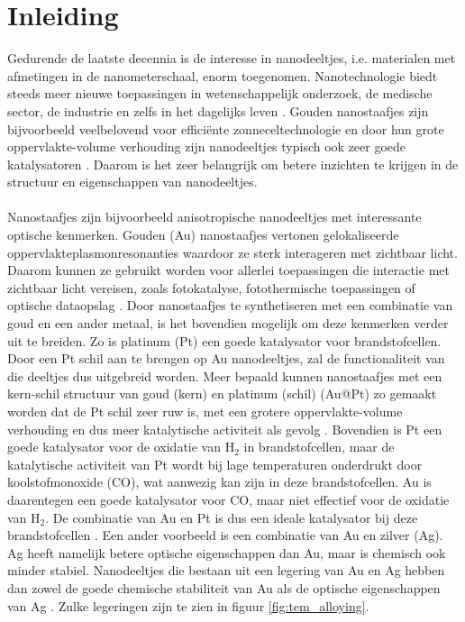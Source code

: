\documentclass{report}
\begin{document}
\chapter{Inleiding}
Gedurende de laatste decennia is de interesse in nanodeeltjes, i.e. materialen met afmetingen in de nanometerschaal, enorm toegenomen. Nanotechnologie biedt steeds meer nieuwe toepassingen in wetenschappelijk onderzoek, de medische sector, de industrie en zelfs in het dagelijks leven \cite{review:nanopart}. Gouden nanostaafjes zijn bijvoorbeeld veelbelovend voor efficiënte zonneceltechnologie en door hun grote oppervlakte-volume verhouding zijn nanodeeltjes typisch ook zeer goede katalysatoren \cite{review:nanopart}. Daarom is het zeer belangrijk om betere inzichten te krijgen in de structuur en eigenschappen van nanodeeltjes.
\\ \\
Nanostaafjes zijn bijvoorbeeld anisotropische nanodeeltjes met interessante optische kenmerken. Gouden (Au) nanostaafjes vertonen gelokaliseerde oppervlakteplasmonresonanties waardoor ze sterk interageren met zichtbaar licht. Daarom kunnen ze gebruikt worden voor allerlei toepassingen die interactie met zichtbaar licht vereisen, zoals fotokatalyse, fotothermische toepassingen of optische dataopslag \cite{paper:bimetalnr}. Door nanostaafjes te synthetiseren met een combinatie van goud en een ander metaal, is het bovendien mogelijk om deze kenmerken verder uit te breiden. Zo is platinum (Pt) een goede katalysator voor brandstofcellen. Door een Pt schil aan te brengen op Au nanodeeltjes, zal de functionaliteit van die deeltjes dus uitgebreid worden. Meer bepaald kunnen nanostaafjes met een kern-schil structuur van goud (kern) en platinum (schil) (Au@Pt) zo gemaakt worden dat de Pt schil zeer ruw is, met een grotere oppervlakte-volume verhouding en dus meer katalytische activiteit als gevolg \cite{paper:bimetalnr, paper:aupt}. Bovendien is Pt een goede katalysator voor de oxidatie van H$_2$ in brandstofcellen, maar de katalytische activiteit van Pt wordt bij lage temperaturen onderdrukt door koolstofmonoxide (CO), wat aanwezig kan zijn in deze brandstofcellen. Au is daarentegen een goede katalysator voor CO, maar niet effectief voor de oxidatie van H$_2$. De combinatie van Au en Pt is dus een ideale katalysator bij deze brandstofcellen \cite{paper:auptkat}. Een ander voorbeeld is een combinatie van Au en zilver (Ag). Ag heeft namelijk betere optische eigenschappen dan Au, maar is chemisch ook minder stabiel. Nanodeeltjes die bestaan uit een legering van Au en Ag hebben dan zowel de goede chemische stabiliteit van Au als de optische eigenschappen van Ag \cite{paper:alloys}. Zulke legeringen zijn te zien in figuur \ref{fig:tem_alloying}. 
\end{document}
